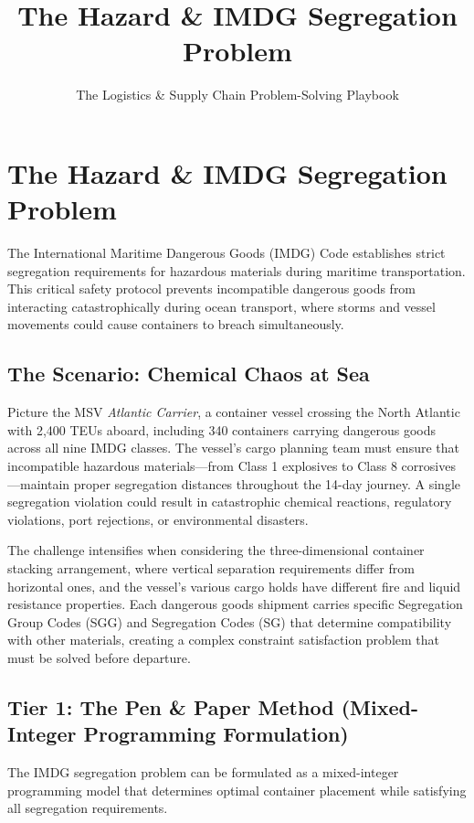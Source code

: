 \documentclass{article}
\title{The Hazard \& IMDG Segregation Problem}
\author{The Logistics \& Supply Chain Problem-Solving Playbook}
\date{}
\begin{document}
\maketitle

\section{The Hazard \& IMDG Segregation Problem}

The International Maritime Dangerous Goods (IMDG) Code establishes strict segregation requirements for hazardous materials during maritime transportation. This critical safety protocol prevents incompatible dangerous goods from interacting catastrophically during ocean transport, where storms and vessel movements could cause containers to breach simultaneously.

\subsection{The Scenario: Chemical Chaos at Sea}

Picture the MSV \textit{Atlantic Carrier}, a container vessel crossing the North Atlantic with 2,400 TEUs aboard, including 340 containers carrying dangerous goods across all nine IMDG classes. The vessel's cargo planning team must ensure that incompatible hazardous materials---from Class 1 explosives to Class 8 corrosives---maintain proper segregation distances throughout the 14-day journey. A single segregation violation could result in catastrophic chemical reactions, regulatory violations, port rejections, or environmental disasters.

The challenge intensifies when considering the three-dimensional container stacking arrangement, where vertical separation requirements differ from horizontal ones, and the vessel's various cargo holds have different fire and liquid resistance properties. Each dangerous goods shipment carries specific Segregation Group Codes (SGG) and Segregation Codes (SG) that determine compatibility with other materials, creating a complex constraint satisfaction problem that must be solved before departure.

\subsection{Tier 1: The Pen \& Paper Method (Mixed-Integer Programming Formulation)}

The IMDG segregation problem can be formulated as a mixed-integer programming model that determines optimal container placement while satisfying all segregation requirements.
\end{document}

